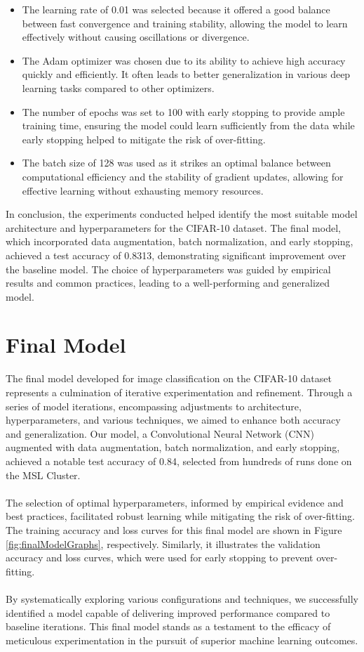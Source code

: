 \documentclass{article}
\begin{document}
\begin{itemize}
\item The learning rate of 0.01 was selected because it offered a good balance between fast convergence and training stability, allowing the model to learn effectively without causing oscillations or divergence.
\item The Adam optimizer was chosen due to its ability to achieve high accuracy quickly and efficiently. It often leads to better generalization in various deep learning tasks compared to other optimizers.
\item The number of epochs was set to 100 with early stopping to provide ample training time, ensuring the model could learn sufficiently from the data while early stopping helped to mitigate the risk of over-fitting.
\item The batch size of 128 was used as it strikes an optimal balance between computational efficiency and the stability of gradient updates, allowing for effective learning without exhausting memory resources.
\end{itemize}
\vspace{0.5cm}
In conclusion, the experiments conducted helped identify the most suitable model architecture and hyperparameters for the CIFAR-10 dataset. The final model, which incorporated data augmentation, batch normalization, and early stopping, achieved a test accuracy of 0.8313, demonstrating significant improvement over the baseline model. The choice of hyperparameters was guided by empirical results and common practices, leading to a well-performing and generalized model.


\section{Final Model}

The final model developed for image classification on the CIFAR-10 dataset represents a culmination of iterative experimentation and refinement. Through a series of model iterations, encompassing adjustments to architecture, hyperparameters, and various techniques, we aimed to enhance both accuracy and generalization. Our model, a Convolutional Neural Network (CNN) augmented with data augmentation, batch normalization, and early stopping, achieved a notable test accuracy of 0.84, selected from hundreds of runs done on the MSL Cluster.
\\\\
The selection of optimal hyperparameters, informed by empirical evidence and best practices, facilitated robust learning while mitigating the risk of over-fitting. The training accuracy and loss curves for this final model are shown in Figure \ref{fig:finalModelGraphs}, respectively. Similarly, it illustrates the validation accuracy and loss curves, which were used for early stopping to prevent over-fitting.
\\\\
By systematically exploring various configurations and techniques, we successfully identified a model capable of delivering improved performance compared to baseline iterations. This final model stands as a testament to the efficacy of meticulous experimentation in the pursuit of superior machine learning outcomes.
\end{document}
